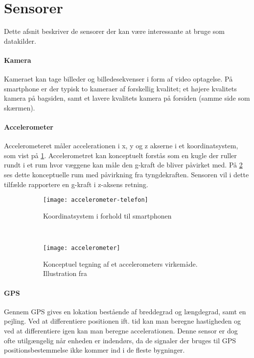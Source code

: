 \section{Sensorer}\label{sensorer}
Dette afsnit beskriver de sensorer der kan være interessante at bruge som datakilder. 

\paragraph{Kamera}
Kameraet kan tage billeder og billedesekvenser i form af video optagelse.
På smartphone er der typisk to kameraer af forskellig kvalitet; et højere kvalitets kamera på bagsiden, samt et lavere kvalitets kamera på forsiden (samme side som skærmen).

\paragraph{Accelerometer}
Accelerometeret måler accelerationen i x, y og z akserne i et koordinatsystem, som vist på \cref{analyse:accelerometer:koo}.
Accelerometret kan konceptuelt forstås som en kugle der ruller rundt i et rum hvor væggene kan måle den g-kraft de bliver påvirket med.
På \cref{analyse:accelerometer:kraft} ses dette konceptuelle rum med påvirkning fra tyngdekraften. 
Sensoren vil i dette tilfælde rapportere en g-kraft i z-aksens retning.

\begin{figure}[h]
	\centering
	\begin{subfigure}[b]{0.47\textwidth}
		\centering
		\texttt{[image: accelerometer-telefon]}
		\caption{Koordinatsystem i forhold til smartphonen}
		\label{analyse:accelerometer:koo}
	\end{subfigure}
	~
	\begin{subfigure}[b]{0.47\textwidth}
		\centering
		\texttt{[image: accelerometer]}
		\caption{Konceptuel tegning af et accelerometers virkemåde. Illustration fra \citep{accelerometer}}
		\label{analyse:accelerometer:kraft}
	\end{subfigure}
	\caption{}
	\label{accelerometer}
\end{figure} 

\paragraph{GPS}
Gennem GPS gives en lokation bestående af breddegrad og længdegrad, samt en pejling.
Ved at differentiere positionen ift. tid kan man beregne hastigheden og ved at differentiere igen kan man beregne accelerationen.
Denne sensor er dog ofte utilgængelig når enheden er indendørs, da de signaler der bruges til GPS positionsbestemmelse ikke kommer ind i de fleste bygninger.

